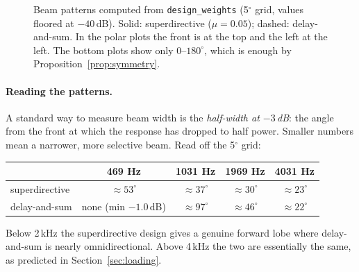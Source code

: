 \documentclass[11pt]{article}
\begin{document}
\begin{figure}[p]
\caption{Beam patterns computed from \texttt{design\_weights} (5$^\circ$ grid, values floored at
$-40$\,dB). Solid: superdirective ($\mu=0.05$); dashed: delay-and-sum. In the polar plots the
front is at the top and the left at the left. The bottom plots show only $0$--$180^\circ$,
which is enough by Proposition~\ref{prop:symmetry}.}
\label{fig:patterns}
\end{figure}

\paragraph{Reading the patterns.} A standard way to measure beam width is the
\emph{half-width at $-3$\,dB}: the angle from the front at which the response has dropped to half
power. Smaller numbers mean a narrower, more selective beam. Read off the 5$^\circ$ grid:

\begin{center}\small
\begin{tabular}{@{}lcccc@{}}
\toprule
& 469 Hz & 1031 Hz & 1969 Hz & 4031 Hz\\
\midrule
superdirective & $\approx53^\circ$ & $\approx37^\circ$ & $\approx30^\circ$ & $\approx23^\circ$\\
delay-and-sum  & none (min $-1.0$\,dB) & $\approx97^\circ$ & $\approx46^\circ$ & $\approx22^\circ$\\
\bottomrule
\end{tabular}
\end{center}

\noindent
Below 2\,kHz the superdirective design gives a genuine forward lobe where delay-and-sum is nearly
omnidirectional. Above 4\,kHz the two are essentially the same, as predicted in
Section~\ref{sec:loading}.
\end{document}
